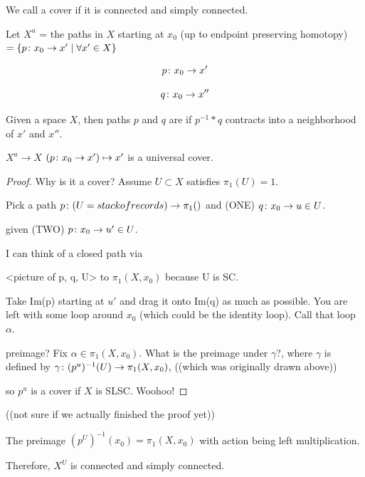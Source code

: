 \documentclass[11pt,leqno,oneside]{amsart}
\newenvironment{dateenv}{
  \vspace{1em}
}{
  \vspace{1em}
}
\newcommand{\mydate}[4]{
  \newdate{#1}{#2}{#3}{#4}
  \begin{dateenv}
    \hfill\displaydate{#1}
  \end{dateenv}
}
\numberwithin{thm}{section}
\newcommand{\fund}[1][1]{\pi_{#1}}
\begin{document}
\begin{defn}
  We call a cover  if it is connected and simply connected.
\end{defn}

Let $X^a$ = {the paths in $X$ starting at $x_0$ (up to endpoint preserving homotopy) }
$= \{ p \colon x_0 \to x' \mid \forall x' \in X \}$

$$p \colon x_0 \to x'$$

$$q \colon x_0 \to x''$$

\begin{defn}
  Given a space $X$, then paths $p$ and $q$ are  if $p^{-1}*q$ contracts into a neighborhood of $x'$ and $x''$.
\end{defn}

\begin{thm}
  $X^a \to X$
  $(p \colon x_0 \to x') \mapsto x'$
  is a universal cover.
\end{thm}
\begin{proof}
  Why is it a cover?  Assume $U \subset X$ satisfies $\fund(U) = 1$.

  Pick a path $p \from (U = stack of records) \to \fund()$ and (ONE) $q \colon x_0 \to u \in U$.

  given (TWO) $p \colon x_0 \to u' \in U$.

  I can think of a closed path via

  <picture of p, q, U> to $\fund(X, x_0)$
  because U is SC.

  Take Im(p) starting at $u'$ and drag it onto Im(q) as much as possible.  You are left with some loop around $x_0$ (which could be the identity loop).  Call that loop $\alpha$.

  preimage?  Fix $\alpha \in \fund(X, x_0)$.  What is the preimage under $\gamma$?, where $\gamma$ is defined by $\gamma \from (p^u)^{-1}(U) \to \fund(X, x_0)$, ((which was originally drawn above))

  so $p^u$ is a cover if $X$ is SLSC.  Woohoo!
\end{proof}
((not sure if we actually finished the proof yet))

The preimage $(p^U)^{-1}(x_0) = \fund(X, x_0)$ with action being left multiplication.

Therefore, $X^U$ is connected and simply connected.

\mydate{d6}{3}{2}{2017}
\end{document}
